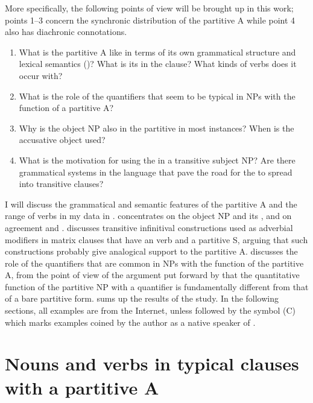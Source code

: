 \documentclass[output=paper]{LSP/langsci}
\begin{document}
More specifically, the following points of view will be brought up in this work; points 1–3 concern the synchronic distribution of the partitive A while point 4 also has diachronic connotations.


\begin{enumerate}
\item 
What is the partitive A like in terms of its own grammatical structure and lexical semantics (\eg {})? What is its  in the clause? What kinds of verbs does it occur with? 

\item 
What is the role of the quantifiers that seem to be typical in NPs with the function of a partitive A?

\item 
Why is the object NP also in the partitive in most instances? When is the accusative object used?

\item 
What is the motivation for using the  in a transitive subject NP? Are there grammatical systems in the language that pave the road for the  to spread into transitive clauses?

\end{enumerate}

I will discuss the grammatical and semantic features of the partitive A and the range of verbs in my data in .  concentrates on the object NP and its , and  on agreement and .  discusses transitive infinitival constructions used as adverbial modifiers in matrix clauses that have an  verb and a partitive S, arguing that such constructions probably give analogical support to the partitive A.  discusses the role of the quantifiers that are common in NPs with the function of the partitive A, from the point of view of the argument put forward by \citet{Yli-Vakkuri1979Partitiivisubjektin} that the quantitative function of the partitive NP with a quantifier is fundamentally different from that of a bare partitive form.  sums up the results of the study. In the following sections, all examples are from the Internet, unless followed by the symbol (C) which marks examples coined by the author as a native speaker of .

\section{Nouns and verbs in typical clauses with a partitive A}
\label{15-hu-sec:2}
\end{document}
